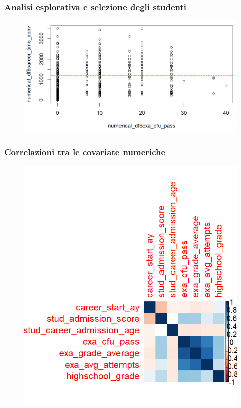 \documentclass{beamer}
\begin{document}
\begin{frame}
    \frametitle{Analisi esplorativa e selezione degli studenti}
    \begin{figure}[h]
    \centering
    \includegraphics[width=1\textwidth]{Screenshot 2024-05-26 123827.png} %
    \label{}
\end{figure}
    
\end{frame}



\begin{frame}
\frametitle{Correlazioni tra le covariate numeriche}
\begin{figure}[h]
    \centering
    \includegraphics[width=.7\textwidth]{Rplot.png} %
    \label{Tabella delle correlazioni}
\end{figure}
\end{frame}
\end{document}
